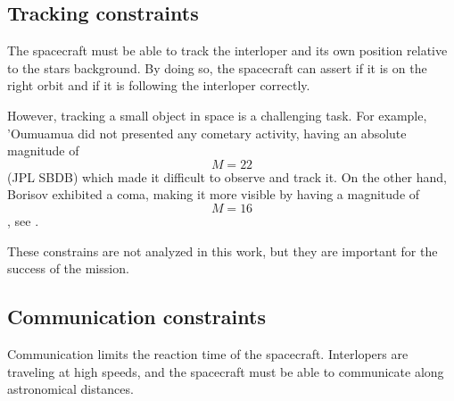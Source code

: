 \subsection{Tracking constraints}

The spacecraft must be able to track the interloper and its own position
relative to the stars background. By doing so, the spacecraft can assert if it
is on the right orbit and if it is following the interloper correctly.

However, tracking a small object in space is a challenging task. For example,
'Oumuamua did not presented any cometary activity, having an absolute magnitude
of $$M = 22$$ (JPL SBDB) which made it difficult to
observe and track it. On the other hand, Borisov exhibited a coma, making it
more visible by having a magnitude of $$M = 16$$, see \cite{jewitt2020}.

These constrains are not analyzed in this work, but they are important for the
success of the mission.

\subsection{Communication constraints}

Communication limits the reaction time of the spacecraft. Interlopers are
traveling at high speeds, and the spacecraft must be able to communicate along
astronomical distances.
